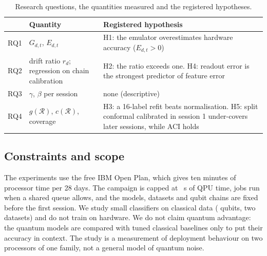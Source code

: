 \begin{table}[t]
\centering
\caption{Research questions, the quantities measured and the registered hypotheses.}
\label{tab:rq}
\footnotesize
\setlength{\tabcolsep}{3pt}
\begin{tabular}{@{}l>{\raggedright\arraybackslash}p{2.35cm}>{\raggedright\arraybackslash}p{4.2cm}@{}}
\toprule
 & Quantity & Registered hypothesis \\
\midrule
RQ1 & $G_{d,t}$, $E_{d,t}$ & H1: the emulator overestimates hardware accuracy ($E_{d,t}>0$) \\
RQ2 & drift ratio $r_d$; regression on chain calibration & H2: the ratio exceeds one. H4: readout error is the strongest predictor of feature error \\
RQ3 & $\gamma$, $\beta$ per session & none (descriptive) \\
RQ4 & $g(\mathcal R)$, $c(\mathcal R)$, coverage & H3: a 16-label refit beats normalisation. H5: split conformal calibrated in session 1 under-covers later sessions, while ACI holds \\
\bottomrule
\end{tabular}
\end{table}

\subsection{Constraints and scope}
The experiments use the free IBM Open Plan, which gives ten minutes of processor time per 28
days. The campaign is capped at ~s of QPU time, jobs run when a shared queue
allows, and the models, datasets and qubit chains are fixed before the first session. We study
small classifiers on classical data ( qubits, two datasets) and do not train on
hardware. We do not claim quantum advantage: the quantum models are compared with tuned
classical baselines only to put their accuracy in context. The study is a measurement of
deployment behaviour on two processors of one family, not a general model of quantum noise.
